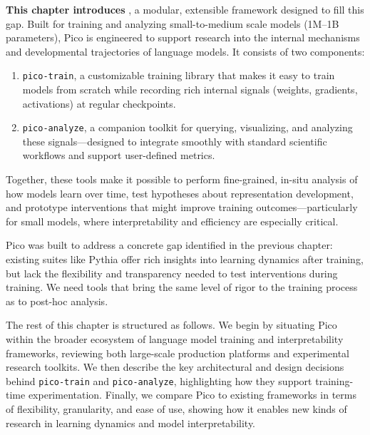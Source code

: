 \textbf{This chapter introduces \pico}, a modular, extensible framework designed to fill this gap. Built for training and analyzing small-to-medium scale models (1M--1B parameters), Pico is engineered to support research into the internal mechanisms and developmental trajectories of language models. It consists of two components:

\begin{enumerate}
    \item \texttt{pico-train}, a customizable training library that makes it easy to train models from scratch while recording rich internal signals (weights, gradients, activations) at regular checkpoints.
    \item \texttt{pico-analyze}, a companion toolkit for querying, visualizing, and analyzing these signals—designed to integrate smoothly with standard scientific workflows and support user-defined metrics.
\end{enumerate}

Together, these tools make it possible to perform fine-grained, in-situ analysis of how models learn over time, test hypotheses about representation development, and prototype interventions that might improve training outcomes—particularly for small models, where interpretability and efficiency are especially critical.

Pico was built to address a concrete gap identified in the previous chapter: existing suites like Pythia offer rich insights into learning dynamics after training, but lack the flexibility and transparency needed to test interventions during training. We need tools that bring the same level of rigor to the training process as to post-hoc analysis.

The rest of this chapter is structured as follows. We begin by situating Pico within the broader ecosystem of language model training and interpretability frameworks, reviewing both large-scale production platforms and experimental research toolkits. We then describe the key architectural and design decisions behind \texttt{pico-train} and \texttt{pico-analyze}, highlighting how they support training-time experimentation. Finally, we compare Pico to existing frameworks in terms of flexibility, granularity, and ease of use, showing how it enables new kinds of research in learning dynamics and model interpretability.


